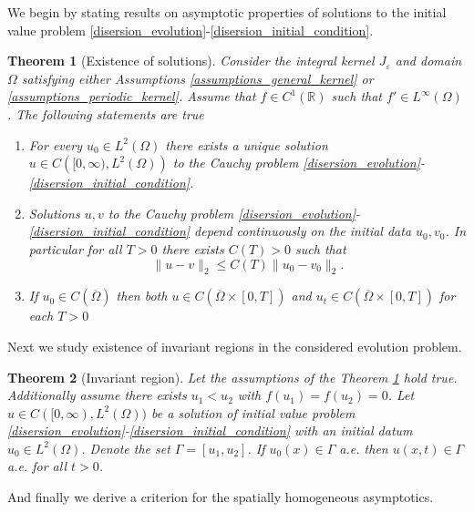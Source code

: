 \documentclass[12pt, a4paper]{article}
\makeatletter
\theoremstyle{break}
\newtheorem{thm}{Theorem}[section]
\theoremstyle{break}
\theoremstyle{break}
\theoremstyle{break}
\theoremstyle{break}
\newcommand{\mylabel}[2]{#2\def\@currentlabel{#2}\label{#1}}
\newcommand{\Leb}{L^2\left(\Omega\right)}
\makeatother
\begin{document}
We begin by stating results on asymptotic properties of solutions to the initial value problem \eqref{disersion_evolution}-\eqref{disersion_initial_condition}.

\begin{thm}[Existence of solutions]
    Consider the integral kernel $J_\varepsilon$ and domain $\Omega$ satisfying either Assumptions \ref{assumptions_general_kernel} or \ref{assumptions_periodic_kernel}. Assume that $f \in C^1(\mathbb{R})$ such that $f' \in L^\infty(\Omega)$. The following statements are true
    \begin{enumerate}[label=\textnormal{(\arabic*)}]
        \item [\mylabel{thm:eu_i}{(i)}] For every $u_0 \in \Leb$ there exists a unique solution $u \in C\left([0, \infty), \Leb\right)$ to the Cauchy problem \eqref{disersion_evolution}-\eqref{disersion_initial_condition}.
        \item [\mylabel{thm:eu_ii}{(ii)}] Solutions $u, v$ to the Cauchy problem \eqref{disersion_evolution}-\eqref{disersion_initial_condition} depend continuously on the initial data $u_0, v_0$. In particular for all $T > 0$ there exists $C(T) > 0$ such that
        \begin{equation}
            \|u - v\|_2 \leq C(T)\|u_0 - v_0\|_2.
        \end{equation}
        \item [\mylabel{thm:eu_iii}{(iii)}] If $u_0 \in C(\overline{\Omega})$ then both $u \in C\left(\overline{\Omega} \times [0, T]\right)$ and $u_t \in C\left(\overline{\Omega} \times [0, T]\right)$ for each $T > 0$
    \end{enumerate}
    \label{thm:existence_uniqueness}
\end{thm}

Next we study existence of invariant regions in the considered evolution problem.

\begin{thm}[Invariant region]
    Let the assumptions of the Theorem \ref{thm:existence_uniqueness} hold true. Additionally assume there exists $u_1 < u_2$ with $f(u_1) = f(u_2) = 0$. Let $u \in C([0, \infty), \Leb)$ be a solution of initial value problem \eqref{disersion_evolution}-\eqref{disersion_initial_condition} with an initial datum $u_0 \in \Leb$. Denote the set $\Gamma = [u_1, u_2]$. If $u_0(x) \in \Gamma$ a.e. then $u(x, t) \in \Gamma$ a.e. for all $t > 0$.
    \label{thm:invariant_region}
\end{thm}

And finally we derive a criterion for the spatially homogeneous asymptotics.
\end{document}
